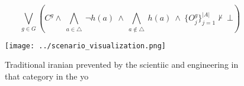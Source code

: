 \documentclass[a4paper]{article}
\begin{document}
\[\bigvee_{g\in G} (C^g \wedge\ \bigwedge_{a\in \triangle}\ \neg h(a)\ \wedge\ \bigwedge_{a\notin \triangle}\ h(a)\ \wedge\ \{O_j^g\}_{j=1}^{|A|} \nvdash\ \bot )\]

\begin{figure}
\centering
\texttt{[image: ../scenario\_visualization.png]}
\caption{Traditional iranian prevented by the scientiic and engineering in that category in the yo
}
\end{figure}
 
\end{document}
